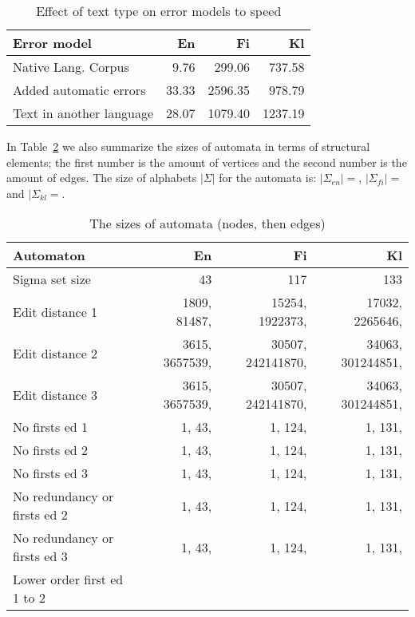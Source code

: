 \documentclass[11pt]{article}
\begin{document}
\begin{table}[h]
\begin{center}
\begin{scriptsize}
\begin{tabular}{|l|rrr|}
\hline
\bf Error model & \bf En & \bf Fi & \bf Kl  \\ 
\hline
Native Lang. Corpus &
9.76&299.06&737.58
\\
Added automatic errors &
33.33&2596.35&978.79
\\
Text in another language &
28.07&1079.40&1237.19
\\
\hline
\end{tabular}
\end{scriptsize}
\end{center}
\caption{\label{table:language-vs-text-type} Effect of text type on
error models to speed}
\end{table}

In Table~\ref{table:automata-sizes} we also summarize the sizes of automata in
terms of structural elements; the first number is the amount of vertices and the
second number is the amount of edges. The size of alphabets $|\Sigma|$
for the automata is: $|\Sigma_{en}| = $, $|\Sigma_{fi}| = $ and $|\Sigma_{kl} =
$.

\begin{table}[h]
\begin{center}
\begin{scriptsize}
\begin{tabular}{|l|rrr|}
\hline
\bf Automaton & \bf En & \bf Fi & \bf Kl  \\ 
\hline
Sigma set size &
 43& 117& 133
\\
\hline
Edit distance 1 &
 1809, 81487,& 15254, 1922373,& 17032, 2265646,
\\
Edit distance 2 &
 3615, 3657539,& 30507, 242141870,& 34063, 301244851,
\\
Edit distance 3 &
 3615, 3657539,& 30507, 242141870,& 34063, 301244851,
\\
No firsts ed 1 & 
 1, 43,& 1, 124,& 1, 131,
\\
No firsts ed 2 &
 1, 43,& 1, 124,& 1, 131,
\\
No firsts ed 3 &
 1, 43,& 1, 124,& 1, 131,
\\
No redundancy or firsts ed 2 &
 1, 43,& 1, 124,& 1, 131,
\\
No redundancy or firsts ed 3 &
 1, 43,& 1, 124,& 1, 131,
\\
Lower order first ed 1 to 2 &
&&
\\
\hline
\end{tabular}
\end{scriptsize}
\end{center}
\caption{\label{table:automata-sizes} The sizes of automata (nodes, then edges)}
\end{table}
\end{document}
